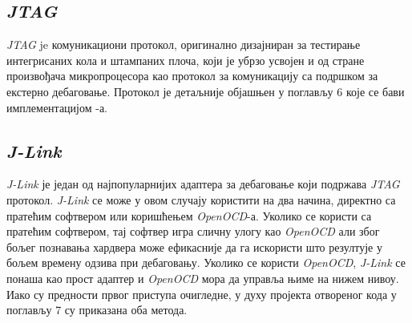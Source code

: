 \subsection{\textit{\acrshort{JTAG}}}

\textit{\acrfull{JTAG}}\cite{jtag_spec} je комуникациони протокол, оригинално дизајниран за тестирање интегрисаних кола и штампаних плоча, који је убрзо усвојен и од стране произвођача микропроцесора као протокол за комуникацију са подршком за екстерно дебаговање. Протокол је детаљније објашњен у поглављу 6 које се бави имплементацијом -а.

\subsection{\textit{J-Link}}

\textit{J-Link}\cite{jlink} је један од најпопуларнијих адаптера за дебаговање који подржава \textit{\acrshort{JTAG}} протокол.
\textit{J-Link} се може у овом случају користити на два начина, директно са пратећим софтвером или коришћењем \textit{Open\acrshort{OCD}}-а. Уколико се користи са пратећим софтвером, тај софтвер игра сличну улогу као \textit{Open\acrshort{OCD}} али због бољег познавања хардвера може ефикасније да га искористи што резултује у бољем времену одзива при дебаговању. Уколико се користи \textit{Open\acrshort{OCD}}, \textit{J-Link} се понаша као прост адаптер и \textit{Open\acrshort{OCD}} мора да управља њиме на нижем нивоу. Иако су предности првог приступа очигледне, у духу пројекта отвореног кода у поглављу 7 су приказана оба метода.